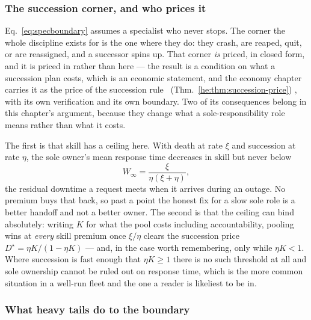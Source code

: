 \documentclass[11pt,a4paper]{article}
\theoremstyle{definition}
\theoremstyle{plain}
\begin{document}
\subsubsection{The succession corner, and who prices it}\label{sec:succession-corner}

Eq.~\ref{eq:specboundary} assumes a specialist who never stops. The corner the
whole discipline exists for is the one where they do: they crash, are reaped,
quit, or are reassigned, and a successor spins up. That corner \emph{is}
priced, in closed form, and it is priced in
 rather than here --- the result is a
condition on what a succession plan costs, which is an economic statement, and
the economy chapter carries it as the price of the succession rule%
\ifpdbook
\ (Thm.~\ref{he:thm:succession-price})%
\fi
, with its own verification and its own boundary. Two of its consequences belong in
this chapter's argument, because they change what a sole-responsibility role
means rather than what it costs.

The first is that skill has a ceiling here. With death at rate $\xi$ and
succession at rate $\eta$, the sole owner's mean response time decreases in
skill but never below
\[
W_\infty=\frac{\xi}{\eta(\xi+\eta)},
\]
the residual downtime a request meets when it arrives during an outage. No
premium buys that back, so past a point the honest fix for a slow sole role is
a better handoff and not a better owner. The second is that the ceiling can
bind absolutely: writing $K$ for what the pool costs including accountability,
pooling wins at \emph{every} skill premium once $\xi/\eta$ clears the
succession price $D^\star=\eta K/(1-\eta K)$ --- and, in the case worth
remembering, only while $\eta K<1$. Where succession is fast enough that
$\eta K\ge 1$ there is no such threshold at all and sole ownership cannot be
ruled out on response time, which is the more common situation in a
well-run fleet and the one a reader is likeliest to be in.


\subsubsection{What heavy tails do to the boundary}\label{sec:spec-heavy-tails}
\end{document}
